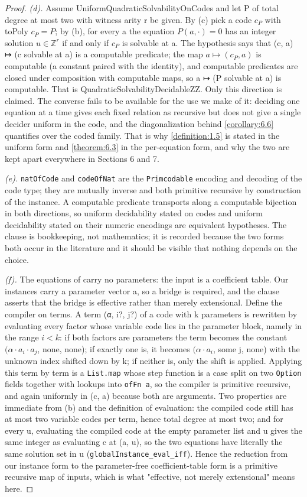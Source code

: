 \documentclass[11pt]{article}
\theoremstyle{plain}
\theoremstyle{definition}
\theoremstyle{remark}
\theoremstyle{plain}
\theoremstyle{definition}
\theoremstyle{remark}
\theoremstyle{plain}
\theoremstyle{definition}
\theoremstyle{remark}
\begin{document}
\begin{proof}
\emph{(d).} Assume UniformQuadraticSolvabilityOnCodes and let P of total degree at most two with witness arity r be given. By (c) pick a code $c_{P}$ with toPoly $c_{P} = P$; by (b), for every a the equation $P(a, ·) = 0$ has an integer solution $u ∈ ℤ^{r}$ if and only if $c_{P}$ is solvable at a. The hypothesis says that (c, a) ↦ (c solvable at a) is a computable predicate; the map $a ↦ (c_{P}, a)$ is computable (a constant paired with the identity), and computable predicates are closed under composition with computable maps, so a ↦ (P solvable at a) is computable. That is QuadraticSolvabilityDecidableZZ. Only this direction is claimed. The converse fails to be available for the use we make of it: deciding one equation at a time gives each fixed relation as recursive but does not give a single decider uniform in the code, and the diagonalization behind \cref{corollary:6.6} quantifies over the coded family. That is why \cref{definition:1.5} is stated in the uniform form and \cref{theorem:6.3} in the per-equation form, and why the two are kept apart everywhere in Sections 6 and 7.

\emph{(e).} \texttt{natOfCode} and \texttt{codeOfNat} are the \texttt{Primcodable} encoding and decoding of the code type; they are mutually inverse and both primitive recursive by construction of the instance. A computable predicate transports along a computable bijection in both directions, so uniform decidability stated on codes and uniform decidability stated on their numeric encodings are equivalent hypotheses. The clause is bookkeeping, not mathematics; it is recorded because the two forms both occur in the literature and it should be visible that nothing depends on the choice.

\emph{(f).} The equations of \cite{GS04} carry no parameters: the input is a coefficient table. Our instances carry a parameter vector a, so a bridge is required, and the clause asserts that the bridge is effective rather than merely extensional. Define the compiler on terms. A term (α, i?, j?) of a code with k parameters is rewritten by evaluating every factor whose variable code lies in the parameter block, namely in the range $i < k$: if both factors are parameters the term becomes the constant $(α·a_{i}·a_{j}$, none, none); if exactly one is, it becomes $(α·a_{i}$, some j, none) with the unknown index shifted down by k; if neither is, only the shift is applied. Applying this term by term is a \texttt{List.\allowbreak{}map} whose step function is a case split on two \texttt{Option} fields together with lookups into \texttt{ofFn a}, so the compiler is primitive recursive, and again uniformly in (c, a) because both are arguments. Two properties are immediate from (b) and the definition of evaluation: the compiled code still has at most two variable codes per term, hence total degree at most two; and for every u, evaluating the compiled code at the empty parameter list and u gives the same integer as evaluating c at (a, u), so the two equations have literally the same solution set in u (\texttt{globalInstance\_\allowbreak{}eval\_\allowbreak{}iff}). Hence the reduction from our instance form to the parameter-free coefficient-table form is a primitive recursive map of inputs, which is what "effective, not merely extensional" means here.


\end{proof}
\end{document}
